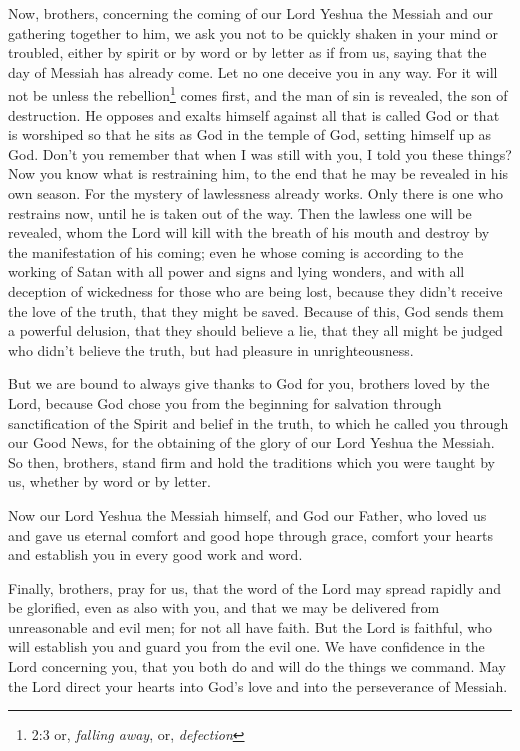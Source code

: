 \mychapter{} \myverse*{}Now, brothers, concerning the coming of our Lord Yeshua the Messiah and our gathering together to him, we ask you \myverse{}not to be quickly shaken in your mind or troubled, either by spirit or by word or by letter as if from us, saying that the day of Messiah has already come. \myverse{}Let no one deceive you in any way. For it will not be unless the rebellion\footnote{2:3 or, \textit{falling away}, or, \textit{defection}} comes first, and the man of sin is revealed, the son of destruction. \myverse{}He opposes and exalts himself against all that is called God or that is worshiped so that he sits as God in the temple of God, setting himself up as God. \myverse{}Don’t you remember that when I was still with you, I told you these things? \myverse{}Now you know what is restraining him, to the end that he may be revealed in his own season. \myverse{}For the mystery of lawlessness already works. Only there is one who restrains now, until he is taken out of the way. \myverse{}Then the lawless one will be revealed, whom the Lord will kill with the breath of his mouth and destroy by the manifestation of his coming; \myverse{}even he whose coming is according to the working of Satan with all power and signs and lying wonders, \myverse{}and with all deception of wickedness for those who are being lost, because they didn’t receive the love of the truth, that they might be saved. \myverse{}Because of this, God sends them a powerful delusion, that they should believe a lie, \myverse{}that they all might be judged who didn’t believe the truth, but had pleasure in unrighteousness.


\myverse{}But we are bound to always give thanks to God for you, brothers loved by the Lord, because God chose you from the beginning for salvation through sanctification of the Spirit and belief in the truth, \myverse{}to which he called you through our Good News, for the obtaining of the glory of our Lord Yeshua the Messiah. \myverse{}So then, brothers, stand firm and hold the traditions which you were taught by us, whether by word or by letter.


\myverse{}Now our Lord Yeshua the Messiah himself, and God our Father, who loved us and gave us eternal comfort and good hope through grace, \myverse{}comfort your hearts and establish you in every good work and word.


\mychapter{} \myverse*{}Finally, brothers, pray for us, that the word of the Lord may spread rapidly and be glorified, even as also with you, \myverse{}and that we may be delivered from unreasonable and evil men; for not all have faith. \myverse{}But the Lord is faithful, who will establish you and guard you from the evil one. \myverse{}We have confidence in the Lord concerning you, that you both do and will do the things we command. \myverse{}May the Lord direct your hearts into God’s love and into the perseverance of Messiah.



